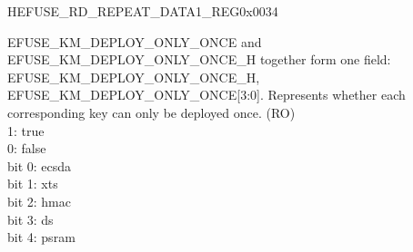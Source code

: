 \begin{register}{H}{EFUSE\_RD\_REPEAT\_DATA1\_REG}{0x0034}
\begin{regdesc}
\begin{reglist}
\label{fielddesc:EFUSEKMDEPLOYONLYONCE}\item [EFUSE\_KM\_DEPLOY\_ONLY\_ONCE] EFUSE\_KM\_DEPLOY\_ONLY\_ONCE and EFUSE\_KM\_DEPLOY\_ONLY\_ONCE\_H together form one field: {EFUSE\_KM\_DEPLOY\_ONLY\_ONCE\_H, EFUSE\_KM\_DEPLOY\_ONLY\_ONCE[3:0]}. Represents whether each corresponding key can only be deployed once. (RO)\\1: true\\0: false\\bit 0: ecsda\\bit 1: xts\\bit 2: hmac\\bit 3: ds\\bit 4: psram

\item [Continued on the next page...]
\end{reglist}\end{regdesc}
\end{register}
\addtocounter{Regfloat}{-1}

